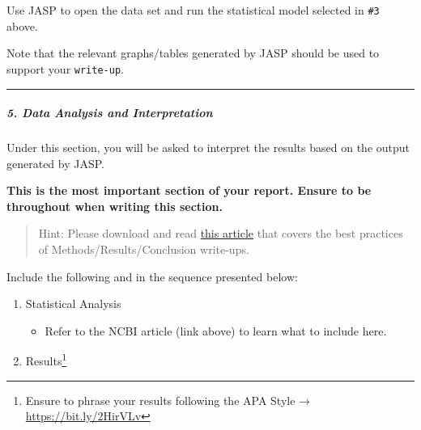\documentclass[11pt,]{article}
\providecommand{\tightlist}{%
  \setlength{\itemsep}{0pt}\setlength{\parskip}{0pt}}
\begin{document}
Use JASP to open the data set and run the statistical model selected in
\texttt{\#3} above.

Note that the relevant graphs/tables generated by JASP should be used to
support your \texttt{write-up}.

\begin{center}\rule{0.5\linewidth}{0.5pt}\end{center}

\hypertarget{data-analysis-and-interpretation}{%
\subparagraph{5. Data Analysis and
Interpretation}\label{data-analysis-and-interpretation}}

Under this section, you will be asked to interpret the results based on
the output generated by JASP.

\textbf{This is the most important section of your report. Ensure to be
throughout when writing this section.}

\begin{quote}
Hint: Please download and read
\href{https://www.ncbi.nlm.nih.gov/pmc/articles/PMC4062332/pdf/biochem-med-22-1-15-3.pdf}{this
article} that covers the best practices of Methods/Results/Conclusion
write-ups.
\end{quote}

Include the following and in the sequence presented below:

\begin{enumerate}
\def\labelenumi{\arabic{enumi}.}
\item
  Statistical Analysis

  \begin{itemize}
  \tightlist
  \item
    Refer to the NCBI article (link above) to learn what to include
    here.
  \end{itemize}
\item
  Results\footnote{Ensure to phrase your results following the APA Style
    → \url{https://bit.ly/2HirVLv}}
\end{enumerate}
\end{document}
